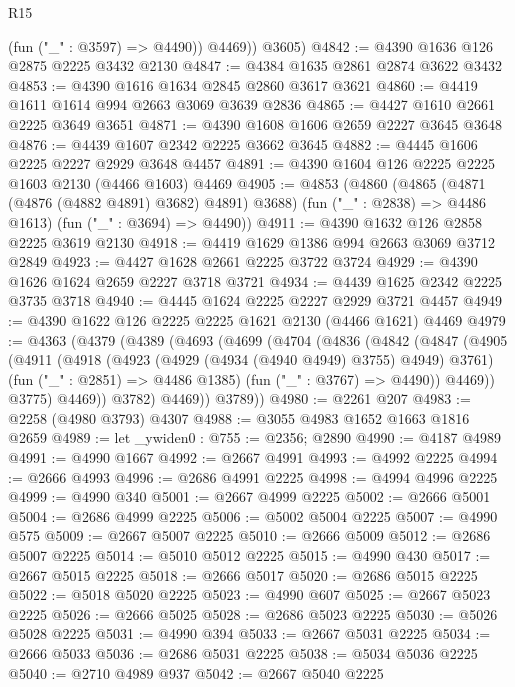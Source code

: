 \begin{lexlean}{R15}
\begin{coremodule}
            (fun ("_" : @3597) => @4490))
          @4469))
      @3605)
@4842 := @4390 @1636 @126 @2875 @2225 @3432 @2130
@4847 := @4384 @1635 @2861 @2874 @3622 @3432
@4853 := @4390 @1616 @1634 @2845 @2860 @3617 @3621
@4860 := @4419 @1611 @1614 @994 @2663 @3069 @3639 @2836
@4865 := @4427 @1610 @2661 @2225 @3649 @3651
@4871 := @4390 @1608 @1606 @2659 @2227 @3645 @3648
@4876 := @4439 @1607 @2342 @2225 @3662 @3645
@4882 := @4445 @1606 @2225 @2227 @2929 @3648 @4457
@4891 := @4390 @1604 @126 @2225 @2225 @1603 @2130 (@4466 @1603) @4469
@4905 := @4853
    (@4860
      (@4865 (@4871 (@4876 (@4882 @4891) @3682) @4891) @3688)
      (fun ("_" : @2838) => @4486 @1613)
      (fun ("_" : @3694) => @4490))
@4911 := @4390 @1632 @126 @2858 @2225 @3619 @2130
@4918 := @4419 @1629 @1386 @994 @2663 @3069 @3712 @2849
@4923 := @4427 @1628 @2661 @2225 @3722 @3724
@4929 := @4390 @1626 @1624 @2659 @2227 @3718 @3721
@4934 := @4439 @1625 @2342 @2225 @3735 @3718
@4940 := @4445 @1624 @2225 @2227 @2929 @3721 @4457
@4949 := @4390 @1622 @126 @2225 @2225 @1621 @2130 (@4466 @1621) @4469
@4979 := @4363
    (@4379
      (@4389
        (@4693
          (@4699
            (@4704
              (@4836
                (@4842
                  (@4847
                    (@4905
                      (@4911
                        (@4918
                          (@4923 (@4929 (@4934 (@4940 @4949) @3755) @4949) @3761)
                          (fun ("_" : @2851) => @4486 @1385)
                          (fun ("_" : @3767) => @4490))
                        @4469))
                    @3775)
                  @4469))
              @3782)
            @4469))
        @3789))
@4980 := @2261 @207
@4983 := @2258 (@4980 @3793) @4307
@4988 := @3055 @4983 @1652 @1663 @1816 @2659
@4989 := let _ywiden0 : @755 := @2356; @2890
@4990 := @4187 @4989
@4991 := @4990 @1667
@4992 := @2667 @4991
@4993 := @4992 @2225
@4994 := @2666 @4993
@4996 := @2686 @4991 @2225
@4998 := @4994 @4996 @2225
@4999 := @4990 @340
@5001 := @2667 @4999 @2225
@5002 := @2666 @5001
@5004 := @2686 @4999 @2225
@5006 := @5002 @5004 @2225
@5007 := @4990 @575
@5009 := @2667 @5007 @2225
@5010 := @2666 @5009
@5012 := @2686 @5007 @2225
@5014 := @5010 @5012 @2225
@5015 := @4990 @430
@5017 := @2667 @5015 @2225
@5018 := @2666 @5017
@5020 := @2686 @5015 @2225
@5022 := @5018 @5020 @2225
@5023 := @4990 @607
@5025 := @2667 @5023 @2225
@5026 := @2666 @5025
@5028 := @2686 @5023 @2225
@5030 := @5026 @5028 @2225
@5031 := @4990 @394
@5033 := @2667 @5031 @2225
@5034 := @2666 @5033
@5036 := @2686 @5031 @2225
@5038 := @5034 @5036 @2225
@5040 := @2710 @4989 @937
@5042 := @2667 @5040 @2225

\end{coremodule}
\end{lexlean}
